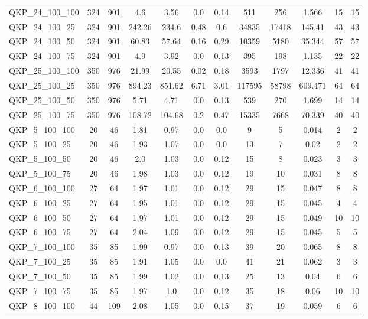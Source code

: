 \begin{table}[!h]
{\begin{tabular}{lccccccccccc}
QKP\_24\_100\_100 & 324 & 901 & 4.6 & 3.56 & 0.0 & 0.14 & 511 & 256 & 1.566 & 15 & 15\\
QKP\_24\_100\_25 & 324 & 901 & 242.26 & 234.6 & 0.48 & 0.6 & 34835 & 17418 & 145.41 & 43 & 43\\
QKP\_24\_100\_50 & 324 & 901 & 60.83 & 57.64 & 0.16 & 0.29 & 10359 & 5180 & 35.344 & 57 & 57\\
QKP\_24\_100\_75 & 324 & 901 & 4.9 & 3.92 & 0.0 & 0.13 & 395 & 198 & 1.135 & 22 & 22\\
QKP\_25\_100\_100 & 350 & 976 & 21.99 & 20.55 & 0.02 & 0.18 & 3593 & 1797 & 12.336 & 41 & 41\\
QKP\_25\_100\_25 & 350 & 976 & 894.23 & 851.62 & 6.71 & 3.01 & 117595 & 58798 & 609.471 & 64 & 64\\
QKP\_25\_100\_50 & 350 & 976 & 5.71 & 4.71 & 0.0 & 0.13 & 539 & 270 & 1.699 & 14 & 14\\
QKP\_25\_100\_75 & 350 & 976 & 108.72 & 104.68 & 0.2 & 0.47 & 15335 & 7668 & 70.339 & 40 & 40\\
QKP\_5\_100\_100 & 20 & 46 & 1.81 & 0.97 & 0.0 & 0.0 & 9 & 5 & 0.014 & 2 & 2\\
QKP\_5\_100\_25 & 20 & 46 & 1.93 & 1.07 & 0.0 & 0.0 & 13 & 7 & 0.02 & 2 & 2\\
QKP\_5\_100\_50 & 20 & 46 & 2.0 & 1.03 & 0.0 & 0.12 & 15 & 8 & 0.023 & 3 & 3\\
QKP\_5\_100\_75 & 20 & 46 & 1.98 & 1.03 & 0.0 & 0.12 & 19 & 10 & 0.031 & 8 & 8\\
QKP\_6\_100\_100 & 27 & 64 & 1.97 & 1.01 & 0.0 & 0.12 & 29 & 15 & 0.047 & 8 & 8\\
QKP\_6\_100\_25 & 27 & 64 & 1.95 & 1.01 & 0.0 & 0.12 & 29 & 15 & 0.045 & 4 & 4\\
QKP\_6\_100\_50 & 27 & 64 & 1.97 & 1.01 & 0.0 & 0.12 & 29 & 15 & 0.049 & 10 & 10\\
QKP\_6\_100\_75 & 27 & 64 & 2.04 & 1.09 & 0.0 & 0.12 & 29 & 15 & 0.045 & 5 & 5\\
QKP\_7\_100\_100 & 35 & 85 & 1.99 & 0.97 & 0.0 & 0.13 & 39 & 20 & 0.065 & 8 & 8\\
QKP\_7\_100\_25 & 35 & 85 & 1.91 & 1.05 & 0.0 & 0.0 & 41 & 21 & 0.062 & 3 & 3\\
QKP\_7\_100\_50 & 35 & 85 & 1.99 & 1.02 & 0.0 & 0.13 & 25 & 13 & 0.04 & 6 & 6\\
QKP\_7\_100\_75 & 35 & 85 & 1.97 & 1.0 & 0.0 & 0.12 & 35 & 18 & 0.06 & 10 & 10\\
QKP\_8\_100\_100 & 44 & 109 & 2.08 & 1.05 & 0.0 & 0.15 & 37 & 19 & 0.059 & 6 & 6\\

\end{tabular}}
\end{table}
